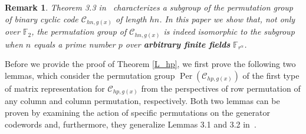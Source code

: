 \documentclass[journal,12pt,onecolumn]{IEEEtran}
\newtheorem{remark}{Remark}
\begin{document}
\begin{remark}
    Theorem 3.3 in~\cite{maAutomorphismGroupsBinary2025} characterizes a subgroup of the permutation group of binary cyclic code $\mathcal{C}_{hn,g(x)}$ of length $hn$. In this paper we show that, not only over $\mathbb{F}_2$, the permutation group of $\mathcal{C}_{hn,g(x)}$ is indeed isomorphic to the subgroup when $n$ equals a prime number $p$ over \textbf{\textit{arbitrary finite fields }}$\mathbb{F}_{r^\alpha}$.
\end{remark}
 

Before we provide the proof of Theorem \ref{L_hp}, we first prove the following two lemmas, which consider the permutation group $\operatorname{Per}(\mathcal{C}_{hp,g(x)})$ of the first type of matrix representation for $\mathcal{C}_{hp,g(x)}$ from the perspectives of row permutation of any column and column permutation, respectively. Both two lemmas can be proven by examining the action of specific permutations on the generator codewords and, furthermore, they generalize Lemmas 3.1 and 3.2 in~\cite{maAutomorphismGroupsBinary2025}.
\end{document}
